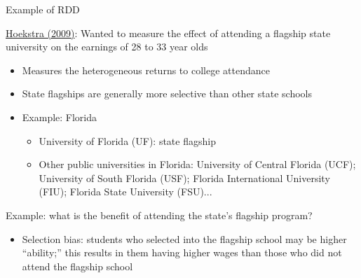 \documentclass[compress, 8pt]{beamer}
\begin{document}
\begin{frame}{Example of RDD}

\href{https://doi.org/10.1162/rest.91.4.717}{Hoekstra (2009)}: Wanted to measure the effect of attending a flagship state university on the earnings of 28 to 33 year olds
\begin{itemize}
    \item Measures the heterogeneous returns to college attendance

    \item State flagships are generally more selective than other state schools

    \item Example: Florida
    \begin{itemize}
        \item University of Florida (UF): state flagship
        \item Other public universities in Florida: University of Central Florida (UCF); University of South Florida (USF); Florida International University (FIU); Florida State University (FSU)...
    \end{itemize}
\end{itemize}

\vspace{3ex}
Example: what is the benefit of attending the state's flagship program?
\begin{itemize}
    \item Selection bias: students who selected into the flagship school may be higher ``ability;'' this results in them having higher wages than those who did not attend the flagship school
\end{itemize}


\end{frame}
\end{document}
